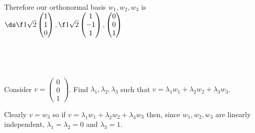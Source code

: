 \documentclass[a4paper]{article}
\begin{document}
Therefore our orthonormal basis $w_1, w_2, w_3$ is $\ds \f1{\sqrt2} \begin{pmatrix}1 \\ 1 \\ 0\end{pmatrix}, \f1{\sqrt2} \begin{pmatrix}1 \\ -1 \\ 1\end{pmatrix}, \begin{pmatrix}0 \\ 0 \\ 1\end{pmatrix}$

\newpage
\subsection{~} %

\begin{questionbody}
Consider $v = \begin{pmatrix}0 \\ 0 \\ 1\end{pmatrix}$. Find $\lambda_1, \lambda_2, \lambda_3$ such that $v = \lambda_1 w_1 + \lambda_2 w_2 + \lambda_3 w_3$.
\end{questionbody}

Clearly $v = w_3$ so if $v = \lambda_1 w_1 + \lambda_2 w_2 + \lambda_3 w_3$ then, since $w_1, w_2, w_3$ are linearly independent, $\lambda_1 = \lambda_2 = 0$ and $\lambda_3 = 1$.


\end{document}
